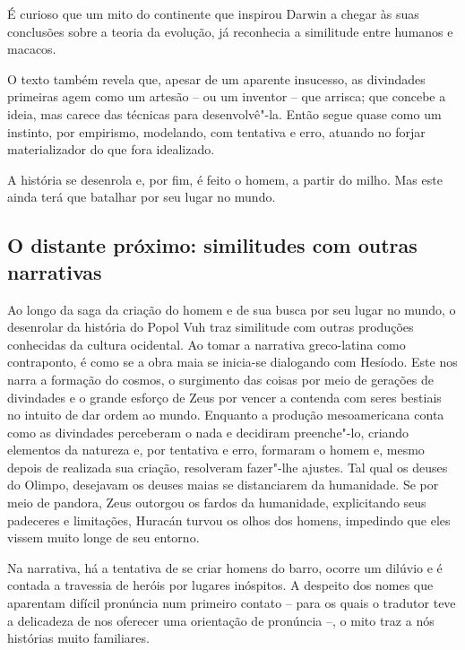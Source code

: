 \documentclass[12pt]{extarticle}
\begin{document}
É curioso que um mito do continente que inspirou Darwin a chegar às suas
conclusões sobre a teoria da evolução, já reconhecia a similitude entre
humanos e macacos.

O texto também revela que, apesar de um aparente insucesso, as
divindades primeiras agem como um artesão -- ou um inventor -- que
arrisca; que concebe a ideia, mas carece das técnicas para
desenvolvê"-la. Então segue quase como um instinto, por empirismo,
modelando, com tentativa e erro, atuando no forjar materializador do que
fora idealizado.

A história se desenrola e, por fim, é feito o homem, a partir do milho.
Mas este ainda terá que batalhar por seu lugar no mundo.





\subsection{O distante próximo: similitudes com outras narrativas}

Ao longo da saga da criação do homem e de sua busca por seu lugar no
mundo, o desenrolar da história do Popol Vuh traz similitude com outras
produções conhecidas da cultura ocidental. Ao tomar a narrativa
greco-latina como contraponto, é como se a obra maia se inicia-se
dialogando com Hesíodo. Este nos narra a formação do cosmos, o
surgimento das coisas por meio de gerações de divindades e o grande
esforço de Zeus por vencer a contenda com seres bestiais no intuito de
dar ordem ao mundo. Enquanto a produção mesoamericana conta como as
divindades perceberam o nada e decidiram preenche"-lo, criando elementos
da natureza e, por tentativa e erro, formaram o homem e, mesmo depois de
realizada sua criação, resolveram fazer"-lhe ajustes. Tal qual os deuses
do Olimpo, desejavam os deuses maias se distanciarem da humanidade. Se
por meio de pandora, Zeus outorgou os fardos da humanidade, explicitando
seus padeceres e limitações, Huracán turvou os olhos dos homens,
impedindo que eles vissem muito longe de seu entorno.




Na narrativa, há a tentativa de se criar homens do barro, ocorre um
dilúvio e é contada a travessia de heróis por lugares inóspitos. A
despeito dos nomes que aparentam difícil pronúncia num primeiro contato
-- para os quais o tradutor teve a delicadeza de nos oferecer uma
orientação de pronúncia --, o mito traz a nós histórias muito
familiares.
\end{document}
